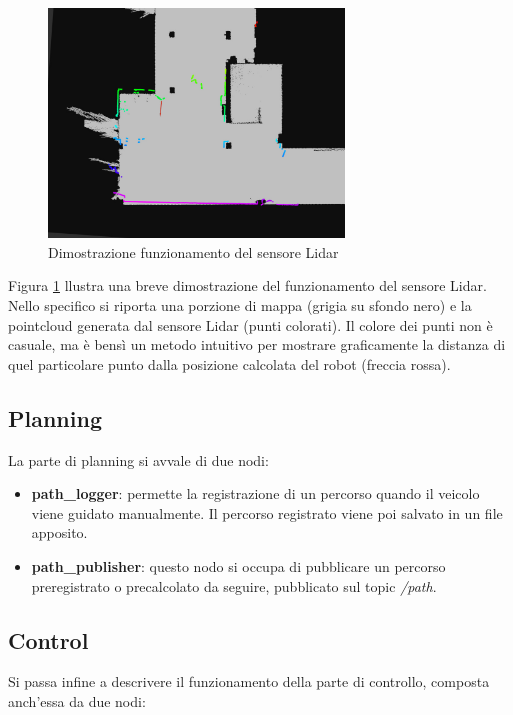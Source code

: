 \begin{figure}[h]
  \centering
  \includegraphics[width=0.7\textwidth]{figures/lidar_map.png}
  \caption{Dimostrazione funzionamento del sensore Lidar}
  \label{funzionamento_particle_filter}
\end{figure}

\noindent Figura \ref{funzionamento_particle_filter} llustra una breve dimostrazione del funzionamento del sensore Lidar. Nello specifico si riporta una porzione di mappa (grigia su sfondo nero) e la pointcloud generata dal sensore Lidar (punti colorati). Il colore dei punti non è casuale, ma è bensì un metodo intuitivo per mostrare graficamente la distanza di quel particolare punto dalla posizione calcolata del robot (freccia rossa).

\subsection{Planning}
\noindent La parte di planning si avvale di due nodi:

\begin{itemize}
  \item \textbf{path\_logger}: permette la registrazione di un percorso quando il veicolo viene guidato manualmente. Il percorso registrato viene poi salvato in un file apposito.
  \item \textbf{path\_publisher}: questo nodo si occupa di pubblicare un percorso preregistrato o precalcolato da seguire, pubblicato sul topic \textit{/path}.  
\end{itemize}

\subsection{Control}
\noindent Si passa infine a descrivere il funzionamento della parte di controllo, composta anch'essa da due nodi:

